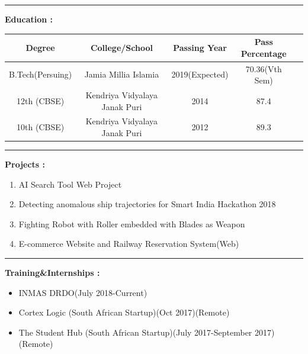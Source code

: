 \documentclass[11pt,a4paper]{article}
\begin{document}
\hfill
\hrule
\begin{multicols}{2}
	\begin{minipage}{0.15\paperwidth}
		\textbf{Education : }
	\end{minipage}
	\begin{minipage}{0.7\paperwidth}
		\renewcommand{\arraystretch}{2}
		\begin{tabular}{|c|c|c|c|c|}
			\hline
			Degree&College\//School&Passing Year&Pass Percentage\\
			\hline
			B.Tech(Persuing)&Jamia Millia Islamia&2019(Expected)&70.36(Vth Sem)\\
			\hline
			12th (CBSE)&Kendriya Vidyalaya Janak Puri&2014&87.4\\
			\hline
			10th (CBSE)&Kendriya Vidyalaya Janak Puri&2012&89.3\\
			\hline
		\end{tabular}
	\end{minipage}
\end{multicols}
\hfill
\hrule
\begin{multicols}{2}
	\begin{minipage}{0.15\paperwidth}
		\textbf{Projects :}
	\end{minipage}
	\begin{minipage}{0.7\paperwidth}
		\begin{enumerate}
			\item AI Search Tool Web Project 
			\item Detecting anomalous ship trajectories for Smart India Hackathon 2018
			\item Fighting Robot with Roller embedded with Blades as Weapon
			\item E-commerce Website and Railway Reservation System(Web)
		\end{enumerate}
	\end{minipage}
\end{multicols}
\hfill
\hrule
\begin{multicols}{2}
	\begin{minipage}{0.16\paperwidth}
		\textbf{Training\&\linebreak Internships :}
	\end{minipage}
	\begin{minipage}{0.7\paperwidth}
		\begin{itemize}
			\item INMAS DRDO(July 2018-Current)
			\item Cortex Logic (South African Startup)(Oct 2017)(Remote)
			\item The Student Hub (South African Startup)(July 2017-September 2017)(Remote)
		\end{itemize}
	\end{minipage}
\end{multicols}
\end{document}
